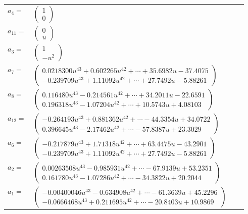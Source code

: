 \documentclass[1p]{elsarticle_modified}
\theoremstyle{definition}
\begin{document}
\begin{tabular}{m{7pt} m{180pt} m{7pt} m{180pt} }
\flushright $a_{4}=$&$\begin{pmatrix}1\\0\end{pmatrix}$ \\
\flushright $a_{11}=$&$\begin{pmatrix}0\\u\end{pmatrix}$ \\
\flushright $a_{3}=$&$\begin{pmatrix}1\\- u^2\end{pmatrix}$ \\
\flushright $a_{7}=$&$\begin{pmatrix}0.0218300 u^{43}+0.602265 u^{42}+\cdots+35.6982 u-37.4075\\-0.239709 u^{43}+1.11092 u^{42}+\cdots+27.7492 u-5.88261\end{pmatrix}$ \\
\flushright $a_{8}=$&$\begin{pmatrix}0.116480 u^{43}-0.214561 u^{42}+\cdots+34.2011 u-22.6591\\0.196318 u^{43}-1.07204 u^{42}+\cdots+10.5743 u+4.08103\end{pmatrix}$ \\
\flushright $a_{12}=$&$\begin{pmatrix}-0.264193 u^{43}+0.881362 u^{42}+\cdots-44.3354 u+34.0722\\0.396645 u^{43}-2.17462 u^{42}+\cdots-57.8387 u+23.3029\end{pmatrix}$ \\
\flushright $a_{6}=$&$\begin{pmatrix}-0.217879 u^{43}+1.71318 u^{42}+\cdots+63.4475 u-43.2901\\-0.239709 u^{43}+1.11092 u^{42}+\cdots+27.7492 u-5.88261\end{pmatrix}$ \\
\flushright $a_{2}=$&$\begin{pmatrix}0.00263508 u^{43}-0.985931 u^{42}+\cdots-67.9139 u+53.2351\\0.161780 u^{43}-1.07286 u^{42}+\cdots-34.3822 u+20.2044\end{pmatrix}$ \\
\flushright $a_{1}=$&$\begin{pmatrix}-0.00400046 u^{43}-0.634908 u^{42}+\cdots-61.3639 u+45.2296\\-0.0666468 u^{43}+0.211695 u^{42}+\cdots-20.8403 u+10.9869\end{pmatrix}$ \\

\end{tabular}
\end{document}
